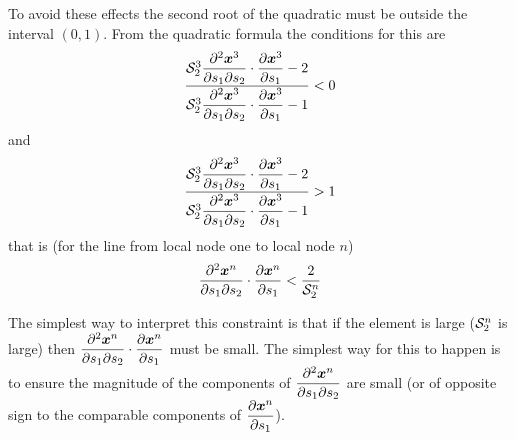 To avoid these effects the second root of the quadratic must be outside the
interval $(0,1)$. From the quadratic formula the conditions for this are
\begin{equation}
  \dfrac{\nsftwo{3}{2}\dotprod{\deltwoby{\nodept{\vect{x}}{3}}{s_{1}}{s_{2}}}
    {\delby{\nodept{\vect{x}}{3}}{s_{1}}}-2}{\nsftwo{3}{2}\dotprod{
      \deltwoby{\nodept{\vect{x}}{3}}{s_{1}}{s_{2}}}{\delby{\nodept{\vect{x}}{3}}
      {s_{1}}}-1}<0
\end{equation}
and 
\begin{equation}
  \dfrac{\nsftwo{3}{2}\dotprod{\deltwoby{\nodept{\vect{x}}{3}}{s_{1}}{s_{2}}}
    {\delby{\nodept{\vect{x}}{3}}{s_{1}}}-2}{\nsftwo{3}{2}\dotprod{
      \deltwoby{\nodept{\vect{x}}{3}}{s_{1}}{s_{2}}}{\delby{\nodept{\vect{x}}{3}}
      {s_{1}}}-1}>1
\end{equation}
that is (for the line from local node one to local node $n$) 
\begin{equation}
  \dotprod{\deltwoby{\nodept{\vect{x}}{n}}{s_{1}}{s_{2}}}{\delby{\nodept{\vect{x}}
      {n}}{s_{1}}}<\dfrac{2}{\nsftwo{n}{2}}
\end{equation}

The simplest way to interpret this constraint is that if the element is large
(\ie $ \mathcal{S}^{n}_{2} $ is large) then $\dotprod{\deltwoby{\nodept{\vect{x}}{n}}
  {s_{1}}{s_{2}}}{\delby{\nodept{\vect{x}}{n}}{s_{1}}}$ must be small. The
simplest way for this to happen is to ensure the magnitude of the components of
$\deltwoby{\nodept{\vect{x}}{n}}{s_{1}}{s_{2}}$ are small (or of opposite sign to
the comparable components of $\delby{\nodept{\vect{x}}{n}}{s_{1}}$).


